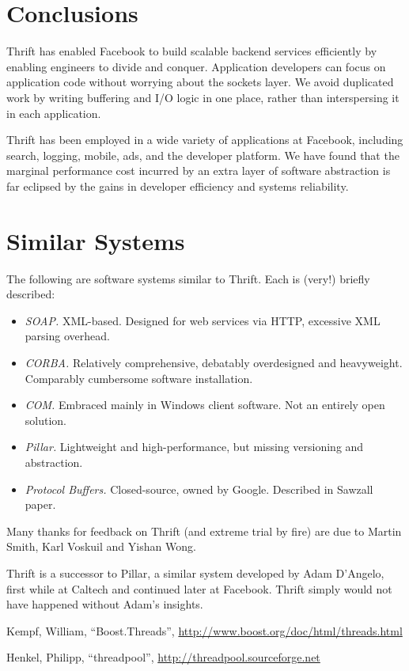\documentclass[nocopyrightspace,blockstyle]{sigplanconf}
\begin{document}
\section{Conclusions}
Thrift has enabled Facebook to build scalable backend
services efficiently by enabling engineers to divide and conquer. Application
developers can focus on application code without worrying about the
sockets layer. We avoid duplicated work by writing buffering and I/O logic
in one place, rather than interspersing it in each application.

Thrift has been employed in a wide variety of applications at Facebook,
including search, logging, mobile, ads, and the developer platform. We have
found that the marginal performance cost incurred by an extra layer of
software abstraction is far eclipsed by the gains in developer efficiency and
systems reliability.

\appendix

\section{Similar Systems}
The following are software systems similar to Thrift. Each is (very!) briefly
described:

\begin{itemize}
\item \textit{SOAP.} XML-based. Designed for web services via HTTP, excessive
XML parsing overhead.
\item \textit{CORBA.} Relatively comprehensive, debatably overdesigned and
heavyweight. Comparably cumbersome software installation.
\item \textit{COM.} Embraced mainly in Windows client software. Not an entirely
open solution.
\item \textit{Pillar.} Lightweight and high-performance, but missing versioning
and abstraction.
\item \textit{Protocol Buffers.} Closed-source, owned by Google. Described in
Sawzall paper.
\end{itemize}

\acks

Many thanks for feedback on Thrift (and extreme trial by fire) are due to
Martin Smith, Karl Voskuil and Yishan Wong.

Thrift is a successor to Pillar, a similar system developed
by Adam D'Angelo, first while at Caltech and continued later at Facebook.
Thrift simply would not have happened without Adam's insights.

\begin{thebibliography}{}

Kempf, William,
``Boost.Threads'',
\url{http://www.boost.org/doc/html/threads.html}

Henkel, Philipp,
``threadpool'',
\url{http://threadpool.sourceforge.net}

\end{thebibliography}
\end{document}
